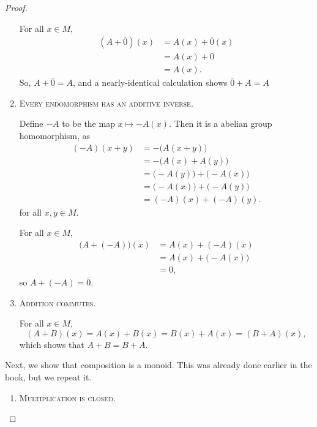 \documentclass{article}
\begin{document}
\begin{proof}
\begin{enumerate}
            For all $x \in M$,
            \begin{align*}
                (A + \overline0)(x)
                &=
                A(x) + \overline0(x) \\
                &=
                A(x) + 0 \\
                &=
                A(x).
            \end{align*}
            So, $A + \overline0 = A$, and a nearly-identical calculation shows $\overline0 + A = A$
        \item 
            \textsc{\color{Crimson} Every endomorphism has an additive inverse.}

            Define $-A$ to be the map $x \mapsto -A(x)$.
            Then it is a abelian group homomorphism, as
            \begin{align*}
                (-A)(x+y)
                &=
                -\big(A(x+y)\big) \\
                &=
                -\big(A(x) + A(y)\big) \\
                &=
                \big(-A(y)\big) + \big(-A(x)\big) \\
                &=
                \big(-A(x)\big) + \big(-A(y)\big) \\
                &=
                (-A)(x) + (-A)(y).
            \end{align*}
            for all $x, y \in M$.

            For all $x \in M$,
            \begin{align*}
                \big(A + (-A)\big)(x)
                &=
                A(x) + (-A)(x) \\
                &=
                A(x) + \big(-A(x)\big) \\
                &=
                0,
            \end{align*}
            so $A + (-A) = \overline0$.
        \item 
            \textsc{\color{Crimson} Addition commutes.}

            For all $x \in M$,
            \[
                (A+B)(x)
                =
                A(x) + B(x)
                =
                B(x) + A(x)
                =
                (B+A)(x),
            \]
            which shows that $A+B = B+A$.
    \end{enumerate}
    Next, we show that composition is a monoid.
    This was already done earlier in the book, but we repeat it.
    \begin{enumerate}
        \item
            \textsc{\color{Crimson} Multiplication is closed.}


\end{enumerate}
\end{proof}
\end{document}
